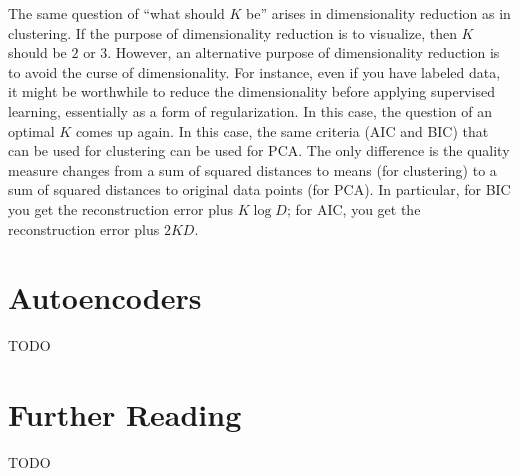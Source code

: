 The same question of ``what should $K$ be'' arises in dimensionality
reduction as in clustering.  If the purpose of dimensionality
reduction is to visualize, then $K$ should be $2$ or $3$.  However, an
alternative purpose of dimensionality reduction is to avoid the curse
of dimensionality.  For instance, even if you have labeled data, it
might be worthwhile to reduce the dimensionality before applying
supervised learning, essentially as a form of regularization.  In this
case, the question of an optimal $K$ comes up again.  In this case,
the same criteria (AIC and BIC) that can be used for clustering can be
used for PCA.  The only difference is the quality measure changes from
a sum of squared distances to means (for clustering) to a sum of
squared distances to original data points (for PCA).  In particular,
for BIC you get the reconstruction error plus $K \log D$; for AIC, you
get the reconstruction error plus $2 K D$.

\section{Autoencoders}

TODO

\section{Further Reading}

TODO














\begin{comment}
- pca
- lsa/svd
- mds
- manifold
- JL
- kmeans++
- hierarchical clustering
- spectral clustering
\end{comment}


